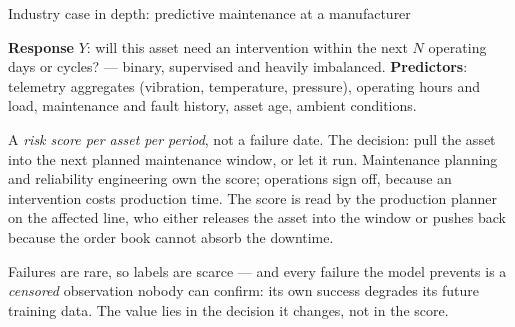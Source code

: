 \documentclass[aspectratio=169,11pt]{beamer}
\begin{document}
\begin{frame}{Industry case in depth: predictive maintenance at a manufacturer}
  \footnotesize
  \begin{industry}
    \textbf{Response} $Y$: will this asset need an intervention within the next $N$ operating
    days or cycles? --- binary, supervised and heavily imbalanced. \textbf{Predictors}:
    telemetry aggregates (vibration, temperature, pressure), operating hours and load,
    maintenance and fault history, asset age, ambient conditions.
  \end{industry}
  \begin{readme}
    A \emph{risk score per asset per period}, not a failure date. The decision: pull the asset
    into the next planned maintenance window, or let it run. Maintenance planning and
    reliability engineering own the score; operations sign off, because an intervention costs
    production time. The score is read by the production planner on the affected line, who
    either releases the asset into the window or pushes back because the order book cannot
    absorb the downtime.
  \end{readme}
  \begin{takeaway}
    Failures are rare, so labels are scarce --- and every failure the model prevents is a
    \emph{censored} observation nobody can confirm: its own success degrades its future
    training data. The value lies in the decision it changes, not in the score.
  \end{takeaway}
\end{frame}
\end{document}
